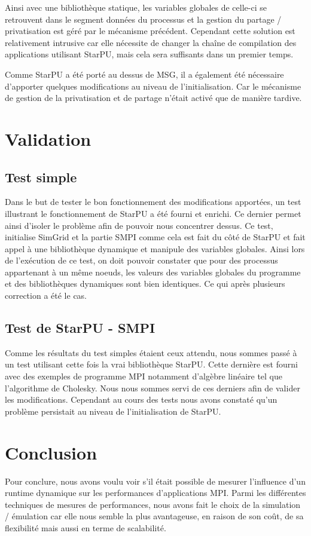 \documentclass[smallextended]{svjour3}
\begin{document}
Ainsi avec une bibliothèque statique, les variables globales de
celle-ci se retrouvent dans le segment données du processus et la
gestion du partage / privatisation est géré par le mécanisme
précédent. Cependant cette solution est relativement intrusive car
elle nécessite de changer la chaîne de compilation des applications
utilisant StarPU, mais cela sera suffisants dans un premier temps. 

Comme StarPU a été porté au dessus de MSG, il a également été
nécessaire d'apporter quelques modifications au niveau de
l'initialisation. Car le mécanisme de gestion de la privatisation et
de partage n'était activé que de manière tardive. 

\section{Validation}
\label{sec-6}
\subsection{Test simple}
\label{sec-6-1}
Dans le but de tester le bon fonctionnement des modifications
apportées, un test illustrant le fonctionnement de StarPU a été
fourni et enrichi. Ce dernier permet ainsi d'isoler le problème
afin de pouvoir nous concentrer dessus. Ce test, initialise SimGrid
et la partie SMPI comme cela est fait du côté de StarPU et fait
appel à une bibliothèque dynamique et manipule des variables
globales. Ainsi lors de l'exécution de ce test, on doit pouvoir
constater que pour des processus appartenant à un même noeuds, les
valeurs des variables globales du programme et des bibliothèques
dynamiques sont bien identiques. Ce qui après plusieurs correction
a été le cas.  
\subsection{Test de StarPU - SMPI}
\label{sec-6-2}
Comme les résultats du test simples étaient ceux attendu, nous
sommes passé à un test utilisant cette fois la vrai bibliothèque
StarPU. Cette dernière est fourni avec des exemples de programme MPI
notamment d'algèbre linéaire tel que l'algorithme de Cholesky. Nous
nous sommes servi de ces derniers afin de valider les
modifications. Cependant au cours des tests nous avons constaté
qu'un problème persistait au niveau de l'initialisation de StarPU.

\section{Conclusion}
\label{sec-7}
Pour conclure, nous avons voulu voir s'il était possible de mesurer
l'influence d'un runtime dynamique sur les performances
d'applications MPI. Parmi les différentes techniques de mesures de
performances, nous avons fait le choix de la simulation / émulation
car elle nous semble la plus avantageuse, en raison de son coût, de
sa flexibilité mais aussi en terme de scalabilité.  
\end{document}
